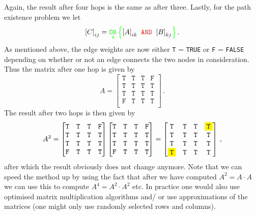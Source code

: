 Again, the result after four hops is the same as after three.  Lastly, for the
path existence problem we let
\begin{equation*}
  {[C]}_{ij} = {\color{green}
    \underset{k}{\texttt{OR}\,}
  }
  {\color{green}\Big\{}
  {[A]}_{ik} {\color{red}\texttt{ AND }} {[B]}_{kj}
  {\color{green}\Big\}}\,.
\end{equation*}
As mentioned above, the edge weights are now either \texttt{T} = \texttt{TRUE}
or \texttt{F} = \texttt{FALSE} depending on whether or not an edge connects the
two nodes in consideration. Thus the matrix after one hop is given by
\newcommand{\TRUE}{\mathtt{T}} \newcommand{\FALSE}{\mathtt{F}}
\begin{equation*}
  A=
  \begin{bmatrix}
    \TRUE & \TRUE & \TRUE & \FALSE \\
    \TRUE & \TRUE & \TRUE & \TRUE \\
    \TRUE & \TRUE & \TRUE & \TRUE \\
    \FALSE & \TRUE & \TRUE & \TRUE \\
  \end{bmatrix}\,.
\end{equation*}
The result after two hops is then given by
\begin{equation*}
  A^2 =
  \begin{bmatrix}
    \TRUE & \TRUE & \TRUE & \FALSE \\
    \TRUE & \TRUE & \TRUE & \TRUE \\
    \TRUE & \TRUE & \TRUE & \TRUE \\
    \FALSE & \TRUE & \TRUE & \TRUE \\
  \end{bmatrix}
  \begin{bmatrix}
    \TRUE & \TRUE & \TRUE & \FALSE \\
    \TRUE & \TRUE & \TRUE & \TRUE \\
    \TRUE & \TRUE & \TRUE & \TRUE \\
    \FALSE & \TRUE & \TRUE & \TRUE \\
  \end{bmatrix}
  =
  \begin{bmatrix}
    \TRUE & \TRUE & \TRUE & \colorbox{yellow}{\texttt{T}} \\
    \TRUE & \TRUE & \TRUE & \TRUE \\
    \TRUE & \TRUE & \TRUE & \TRUE \\
    \colorbox{yellow}{\texttt{T}} & \TRUE & \TRUE & \TRUE \\
  \end{bmatrix}\,,
\end{equation*}
after which the result obviously does not change anymore. Note that we can speed
the method up by using the fact that after we have computed $A^2 = A \cdot A$ we
can use this to compute $A^4 = A^2 \cdot A^2$ etc. In practice one would also
use optimised matrix multiplication algorithms and/ or use approximations of the
matrices (\eg one might only use randomly selected rows and columns).

